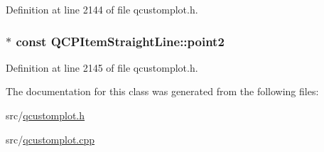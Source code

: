 Definition at line 2144 of file qcustomplot.\-h.

\hypertarget{class_q_c_p_item_straight_line_ad26c0a732e471f63f75d481dcd48cfc9}{
\subsubsection[{point2}]{$\ast$ const Q\-C\-P\-Item\-Straight\-Line\-::point2}}\label{class_q_c_p_item_straight_line_ad26c0a732e471f63f75d481dcd48cfc9}


Definition at line 2145 of file qcustomplot.\-h.



The documentation for this class was generated from the following files\-:\begin{DoxyCompactItemize}
\item 
src/\hyperlink{qcustomplot_8h}{qcustomplot.\-h}\item 
src/\hyperlink{qcustomplot_8cpp}{qcustomplot.\-cpp}\end{DoxyCompactItemize}
